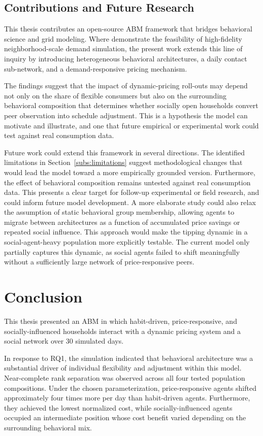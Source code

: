 \documentclass[11pt, a4paper]{article}
\begin{document}
\subsection{Contributions and Future Research}
 
This thesis contributes an open-source ABM framework that bridges behavioral science and grid modeling. Where \textcite{williams_residential_2025} demonstrate the feasibility of high-fidelity neighborhood-scale demand simulation, the present work extends this line of inquiry by introducing heterogeneous behavioral architectures, a daily contact sub-network, and a demand-responsive pricing mechanism.

The findings suggest that the impact of dynamic-pricing roll-outs may depend not only on the share of flexible consumers but also on the surrounding behavioral composition that determines whether socially open households convert peer observation into schedule adjustment. This is a hypothesis the model can motivate and illustrate, and one that future empirical or experimental work could test against real consumption data.
 
Future work could extend this framework in several directions. The identified limitations in Section~\ref{subs:limitations} suggest methodological changes that would lead the model toward a more empirically grounded version. Furthermore, the effect of behavioral composition remains untested against real consumption data. This presents a clear target for follow-up experimental or field research, and could inform future model development. A more elaborate study could also relax the assumption of static behavioral group membership, allowing agents to migrate between architectures as a function of accumulated price savings or repeated social influence. This approach would make the tipping dynamic in a social-agent-heavy population more explicitly testable. The current model only partially captures this dynamic, as social agents failed to shift meaningfully without a sufficiently large network of price-responsive peers.

\section{Conclusion}

This thesis presented an ABM in which habit-driven, price-responsive, and socially-influenced households interact with a dynamic pricing system and a social network over 30 simulated days. 

In response to RQ1, the simulation indicated that behavioral architecture was a substantial driver of individual flexibility and adjustment within this model. Near-complete rank separation was observed across all four tested population compositions. Under the chosen parameterization, price-responsive agents shifted approximately four times more per day than habit-driven agents. Furthermore, they achieved the lowest normalized cost, while socially-influenced agents occupied an intermediate position whose cost benefit varied depending on the surrounding behavioral mix.
 
\end{document}
